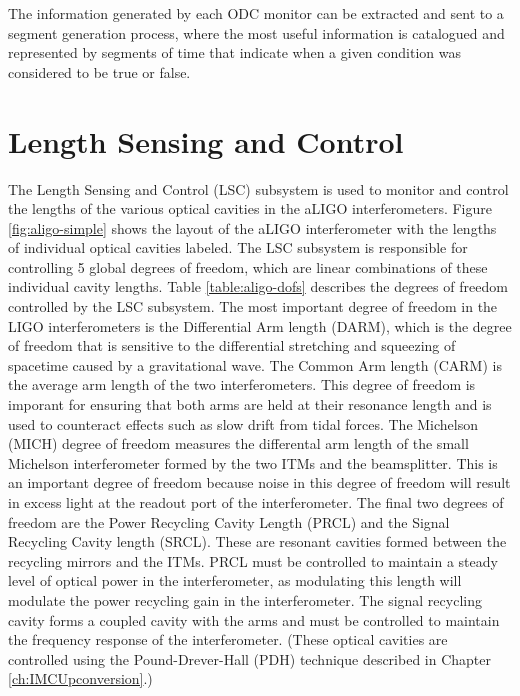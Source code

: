The information generated by each ODC monitor can be extracted and sent to a segment
generation process, where the most useful information is catalogued and represented by
segments of time that indicate when a given condition was considered to be true or false.

\section{Length Sensing and Control}

The Length Sensing and Control (LSC) subsystem is 
used to monitor and control the lengths of the various optical cavities in the 
aLIGO interferometers. Figure \ref{fig:aligo-simple} shows the layout 
of the aLIGO interferometer with the lengths of individual optical cavities 
labeled. 
The LSC subsystem is responsible for controlling 5 global degrees of freedom, 
which are linear combinations of these individual cavity lengths. Table 
\ref{table:aligo-dofs}  
describes the degrees of freedom controlled by the LSC subsystem. 
The most important degree of freedom in the LIGO interferometers is the Differential 
Arm length (DARM), which is the degree of freedom that is sensitive to the differential 
stretching and squeezing of spacetime caused by a gravitational wave. The Common Arm length 
(CARM) is the average arm length of the two interferometers. This degree of freedom is 
imporant for ensuring that both arms are held at their resonance length and is used to 
counteract effects such as slow drift from tidal forces. The Michelson (MICH) degree of 
freedom measures the differental arm length of the small Michelson interferometer formed 
by the two ITMs and the beamsplitter. This is an important degree of freedom because 
noise in this degree of freedom will result in excess light at the readout port of the 
interferometer. The final two degrees of freedom are the Power Recycling Cavity Length 
(PRCL) and the Signal Recycling Cavity length (SRCL). These are resonant cavities formed 
between the recycling mirrors and the ITMs. PRCL must be controlled to maintain a steady 
level of optical power in the interferometer, as modulating this length will modulate 
the power recycling gain in the interferometer. The signal recycling cavity forms a coupled 
cavity with the arms and must be controlled to maintain the 
frequency response of the interferometer. 
(These optical cavities are controlled using the Pound-Drever-Hall (PDH) 
technique described in Chapter \ref{ch:IMCUpconversion}.)

